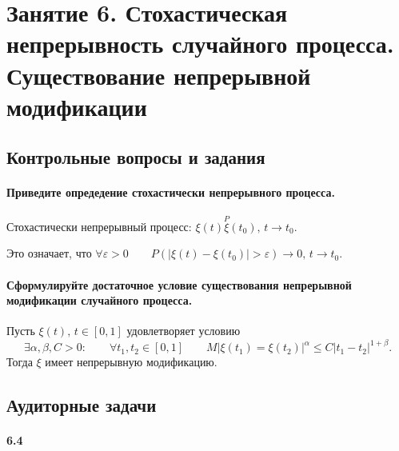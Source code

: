 \chapter*{Занятие 6. Стохастическая непрерывность случайного процесса.
          Существование непрерывной модификации}

\section*{Контрольные вопросы и задания}

\subsubsection*{Приведите опредедение стохастически непрерывного процесса.}

Стохастически непрерывный процесс:
$ \xi \left( t \right) \overset{P} \xi \left( t_0 \right), \, t \to t_0$.

Это означает, что
$ \forall \varepsilon > 0 \qquad
  P \left( \left| \xi \left( t \right) - \xi \left( t_0 \right) \right| > \varepsilon \right) \to 0,
  \, t \to t_0$.

\subsubsection*{Сформулируйте достаточное условие существования непрерывной модификации случайного
                процесса.}

Пусть $ \xi \left( t \right), \, t \in \left[ 0, 1 \right] $ удовлетворяет условию
$$ \exists \alpha, \beta, C > 0: \qquad
  \forall t_1, t_2 \in \left[ 0, 1 \right] \qquad
  M \left| \xi \left( t_1 \right) =
  \xi \left( t_2 \right) \right|^{ \alpha } \leq C \left| t_1 - t_2 \right|^{1 + \beta }.$$
Тогда $ \xi $ имеет непрерывную модификацию.

\section*{Аудиторные задачи}

\subsubsection*{6.4}

